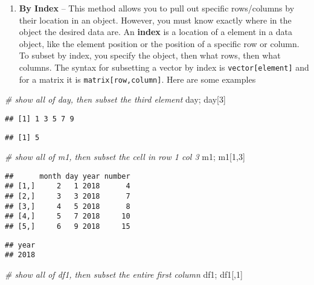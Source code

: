 \documentclass[]{book}
\newenvironment{Shaded}{\begin{snugshade}}{\end{snugshade}}
\newcommand{\DecValTok}[1]{\textcolor[rgb]{0.00,0.00,0.81}{#1}}
\newcommand{\CommentTok}[1]{\textcolor[rgb]{0.56,0.35,0.01}{\textit{#1}}}
\newcommand{\NormalTok}[1]{#1}
\providecommand{\tightlist}{%
  \setlength{\itemsep}{0pt}\setlength{\parskip}{0pt}}
\theoremstyle{definition}
\theoremstyle{definition}
\theoremstyle{definition}
\theoremstyle{remark}
\begin{document}
\begin{enumerate}
\def\labelenumi{\arabic{enumi}.}
\tightlist
\item
  \textbf{By Index} -- This method allows you to pull out specific
  rows/columns by their location in an object. However, you must know
  exactly where in the object the desired data are. An \textbf{index} is
  a location of a element in a data object, like the element position or
  the position of a specific row or column. To subset by index, you
  specify the object, then what rows, then what columns. The syntax for
  subsetting a vector by index is \texttt{vector{[}element{]}} and for a
  matrix it is \texttt{matrix{[}row,column{]}}. Here are some examples
\end{enumerate}

\begin{Shaded}
\begin{Highlighting}[]
\CommentTok{# show all of day, then subset the third element}
\NormalTok{day; day[}\DecValTok{3}\NormalTok{]}
\end{Highlighting}
\end{Shaded}

\begin{verbatim}
## [1] 1 3 5 7 9
\end{verbatim}

\begin{verbatim}
## [1] 5
\end{verbatim}

\begin{Shaded}
\begin{Highlighting}[]
\CommentTok{# show all of m1, then subset the cell in row 1 col 3 }
\NormalTok{m1; m1[}\DecValTok{1}\NormalTok{,}\DecValTok{3}\NormalTok{]}
\end{Highlighting}
\end{Shaded}

\begin{verbatim}
##      month day year number
## [1,]     2   1 2018      4
## [2,]     3   3 2018      7
## [3,]     4   5 2018      8
## [4,]     5   7 2018     10
## [5,]     6   9 2018     15
\end{verbatim}

\begin{verbatim}
## year 
## 2018
\end{verbatim}

\begin{Shaded}
\begin{Highlighting}[]
\CommentTok{# show all of df1, then subset the entire first column}
\NormalTok{df1; df1[,}\DecValTok{1}\NormalTok{]}
\end{Highlighting}
\end{Shaded}
\end{document}
